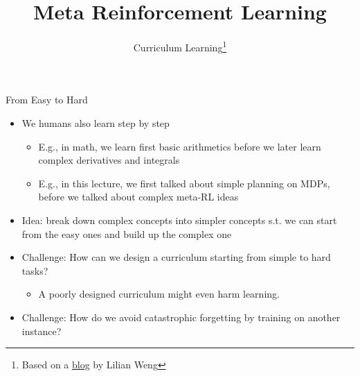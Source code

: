 


\title[Meta-RL]{Meta Reinforcement Learning}
\subtitle{Curriculum Learning\footnote{Based on a \href{https://lilianweng.github.io/lil-log/2020/01/29/curriculum-for-reinforcement-learning.html}{blog} by Lilian Weng}}



	
	\maketitle

\begin{frame}[c]{From Easy to Hard}


\begin{itemize}
	\item We humans also learn step by step
	\begin{itemize}
		\item E.g., in math, we learn first basic arithmetics before we later learn complex derivatives and integrals
		\item E.g., in this lecture, we first talked about simple planning on MDPs, before we talked about complex meta-RL ideas
	\end{itemize}
	\smallskip
	\item \alert{Idea:} break down complex concepts into simpler concepts s.t. we can start from the easy ones and build up the complex one
	\item \alert{Challenge}: How can we design a curriculum starting from simple to hard tasks?
	\begin{itemize}
		\item A poorly designed curriculum might even harm learning.
	\end{itemize}
	\item \alert{Challenge}: How do we avoid catastrophic forgetting by training on another instance?
\end{itemize}


\end{frame}
